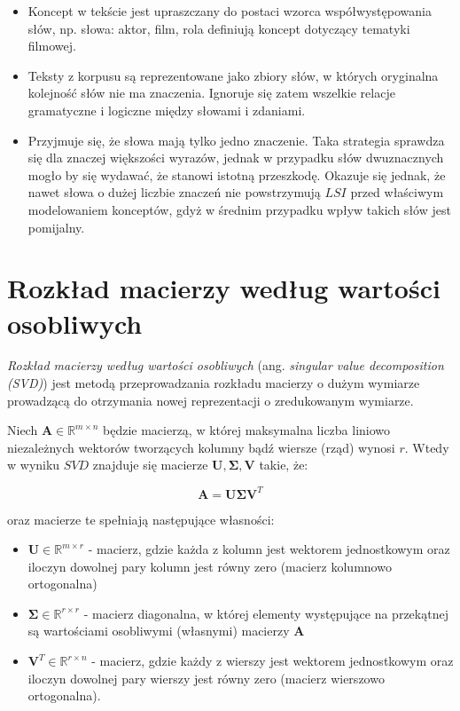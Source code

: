 \documentclass{pracamgr}
\begin{document}
\begin{itemize}
    \item Koncept w tekście jest upraszczany do postaci wzorca współwystępowania słów, np. słowa: aktor, film, rola definiują koncept dotyczący tematyki filmowej.
    \item Teksty z korpusu są reprezentowane jako zbiory słów, w których oryginalna kolejność słów nie ma znaczenia. Ignoruje się zatem wszelkie relacje gramatyczne i logiczne między słowami i zdaniami. 
    \item Przyjmuje się, że słowa mają tylko jedno znaczenie. Taka strategia sprawdza się dla znaczej większości wyrazów, jednak w przypadku słów dwuznacznych mogło by się wydawać, że stanowi istotną przeszkodę. Okazuje się jednak, że nawet słowa o dużej liczbie znaczeń nie powstrzymują $LSI$ przed właściwym modelowaniem konceptów, gdyż w średnim przypadku wpływ takich słów jest pomijalny.
\end{itemize}

\section{Rozkład macierzy według wartości osobliwych}
\textit{Rozkład macierzy według wartości osobliwych} (ang. \textit{singular value decomposition (SVD)}) jest metodą przeprowadzania rozkładu macierzy o dużym wymiarze prowadzącą do otrzymania nowej reprezentacji o zredukowanym wymiarze.

Niech $\mathbf{A} \in \mathbb{R}^{m \times n}$ będzie macierzą, w której maksymalna liczba liniowo niezależnych wektorów tworzących kolumny bądź wiersze (rząd) wynosi $r$. Wtedy w wyniku $SVD$ znajduje się macierze $\mathbf{U}, \mathbf{\Sigma}, \mathbf{V}$ takie, że:

\[
\mathbf{A} = \mathbf{U}\mathbf{\Sigma}\mathbf{V}^T
\]

oraz macierze te spełniają następujące własności:

\begin{itemize}
    \item $\mathbf{U} \in \mathbb{R}^{m \times r}$ - macierz, gdzie każda z kolumn jest wektorem jednostkowym oraz iloczyn dowolnej pary kolumn jest równy zero (macierz kolumnowo ortogonalna)
    \item $\mathbf{\Sigma} \in \mathbb{R}^{r \times r}$ - macierz diagonalna, w której elementy występujące na przekątnej są wartościami osobliwymi (własnymi) macierzy $\mathbf{A}$
    \item $\mathbf{V}^T \in \mathbb{R}^{r \times n}$ - macierz, gdzie każdy z wierszy jest wektorem jednostkowym oraz iloczyn dowolnej pary wierszy jest równy zero (macierz wierszowo ortogonalna).
\end{itemize}
\end{document}
